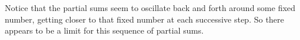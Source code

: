 \begin{activitySolution}
\begin{center}
\end{center}
Notice that the partial sums seem to oscillate back and forth around some fixed number, getting closer to that fixed number at each successive step. So there appears to be a limit for this sequence of partial sums.


\ea
\end{activitySolution}
\aftera 